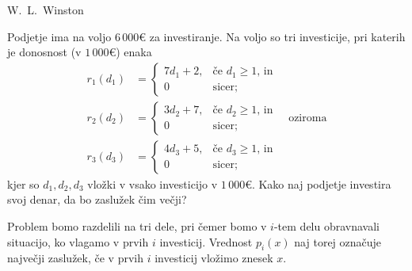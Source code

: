 \begin{naloga}{W.~L.~Winston}{\cite[\S 18, Example~5]{w}}
\begin{vprasanje}
Podjetje ima na voljo $6\,000 €$ za investiranje.
Na voljo so tri investicije, pri katerih je donosnost (v $1\,000 €$) enaka
\begin{align*}
r_1(d_1) &= \begin{cases}
7d_1 + 2, & \text{če $d_1 \ge 1$, in} \\
0 & \text{sicer;}
\end{cases} \\
r_2(d_2) &= \begin{cases}
3d_2 + 7, & \text{če $d_2 \ge 1$, in} \\
0 & \text{sicer;}
\end{cases}
\quad \text{oziroma} \\
r_3(d_3) &= \begin{cases}
4d_3 + 5, & \text{če $d_3 \ge 1$, in} \\
0 & \text{sicer;}
\end{cases}
\end{align*}
kjer so $d_1, d_2, d_3$ vložki v vsako investicijo v $1\,000 €$.
Kako naj podjetje investira svoj denar, da bo zaslužek čim večji?
\end{vprasanje}

\begin{odgovor}
Problem bomo razdelili na tri dele,
pri čemer bomo v $i$-tem delu obravnavali situacijo,
ko vlagamo v prvih $i$ investicij.
Vrednost $p_i(x)$ naj torej označuje največji zaslužek,
če v prvih $i$ investicij vložimo znesek $x$.


\end{odgovor}
\end{naloga}
